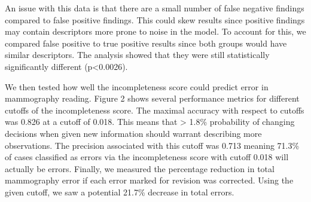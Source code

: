 An issue with this data is that there are a small number of false negative findings compared to false positive findings. This could skew results since positive findings may contain descriptors more prone to noise in the model. To account for this, we compared false positive to true positive results since both groups would have similar descriptors. The analysis showed that they were still statistically significantly different (p<0.0026).

We then tested how well the incompleteness score could predict error in mammography reading. Figure 2 shows several performance metrics for different cutoffs of the incompleteness score. The maximal accuracy with respect to cutoffs was 0.826 at a cutoff of 0.018. This means that > 1.8\% probability of changing decisions when given new information should warrant describing more observations. The precision associated with this cutoff was 0.713 meaning 71.3\% of cases classified as errors via the incompleteness score with cutoff 0.018 will actually be errors. Finally, we measured the percentage reduction in total mammography error if each error marked for revision was corrected. Using the given cutoff, we saw a potential 21.7\% decrease in total errors.
